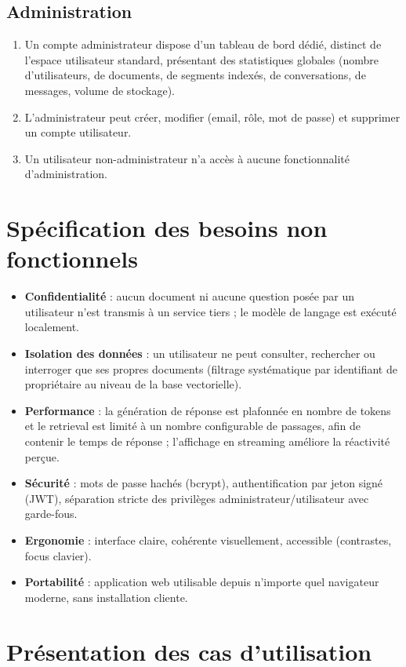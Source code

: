 \documentclass[12pt,a4paper]{report}
\begin{document}
\subsection{Administration}
\begin{enumerate}
  \item Un compte administrateur dispose d'un tableau de bord dédié, distinct de l'espace utilisateur standard, présentant des statistiques globales (nombre d'utilisateurs, de documents, de segments indexés, de conversations, de messages, volume de stockage).
  \item L'administrateur peut créer, modifier (email, rôle, mot de passe) et supprimer un compte utilisateur.
  \item Un utilisateur non-administrateur n'a accès à aucune fonctionnalité d'administration.
\end{enumerate}

\section{Spécification des besoins non fonctionnels}
\begin{itemize}
  \item \textbf{Confidentialité} : aucun document ni aucune question posée par un utilisateur n'est transmis à un service tiers ; le modèle de langage est exécuté localement.
  \item \textbf{Isolation des données} : un utilisateur ne peut consulter, rechercher ou interroger que ses propres documents (filtrage systématique par identifiant de propriétaire au niveau de la base vectorielle).
  \item \textbf{Performance} : la génération de réponse est plafonnée en nombre de tokens et le retrieval est limité à un nombre configurable de passages, afin de contenir le temps de réponse ; l'affichage en streaming améliore la réactivité perçue.
  \item \textbf{Sécurité} : mots de passe hachés (bcrypt), authentification par jeton signé (JWT), séparation stricte des privilèges administrateur/utilisateur avec garde-fous.
  \item \textbf{Ergonomie} : interface claire, cohérente visuellement, accessible (contrastes, focus clavier).
  \item \textbf{Portabilité} : application web utilisable depuis n'importe quel navigateur moderne, sans installation cliente.
\end{itemize}

\section{Présentation des cas d'utilisation}
\end{document}
